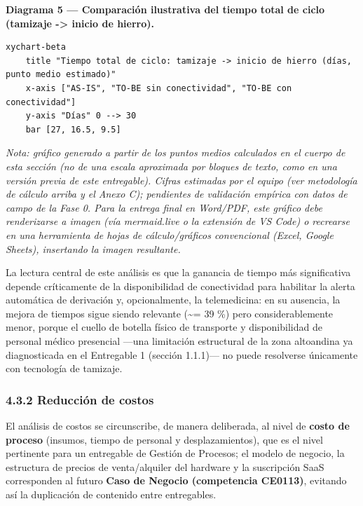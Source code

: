 \documentclass[11pt,a4paper]{article}
\begin{document}
\textbf{Diagrama 5 --- Comparación ilustrativa del tiempo total de ciclo (tamizaje -\textgreater{} inicio de hierro).}

\begin{samepage}\begin{verbatim}
xychart-beta
    title "Tiempo total de ciclo: tamizaje -> inicio de hierro (días, punto medio estimado)"
    x-axis ["AS-IS", "TO-BE sin conectividad", "TO-BE con conectividad"]
    y-axis "Días" 0 --> 30
    bar [27, 16.5, 9.5]
\end{verbatim}\end{samepage}

\emph{Nota: gráfico generado a partir de los puntos medios calculados en el cuerpo de esta sección (no de una escala aproximada por bloques de texto, como en una versión previa de este entregable). Cifras estimadas por el equipo (ver metodología de cálculo arriba y el Anexo C); pendientes de validación empírica con datos de campo de la Fase 0. Para la entrega final en Word/PDF, este gráfico debe renderizarse a imagen (vía mermaid.live o la extensión de VS Code) o recrearse en una herramienta de hojas de cálculo/gráficos convencional (Excel, Google Sheets), insertando la imagen resultante.}

La lectura central de este análisis es que la ganancia de tiempo más significativa depende críticamente de la disponibilidad de conectividad para habilitar la alerta automática de derivación y, opcionalmente, la telemedicina: en su ausencia, la mejora de tiempos sigue siendo relevante (\textasciitilde= 39 \%) pero considerablemente menor, porque el cuello de botella físico de transporte y disponibilidad de personal médico presencial ---una limitación estructural de la zona altoandina ya diagnosticada en el Entregable 1 (sección 1.1.1)--- no puede resolverse únicamente con tecnología de tamizaje.

\subsubsection{4.3.2 Reducción de costos}\label{reducciuxf3n-de-costos}

El análisis de costos se circunscribe, de manera deliberada, al nivel de \textbf{costo de proceso} (insumos, tiempo de personal y desplazamientos), que es el nivel pertinente para un entregable de Gestión de Procesos; el modelo de negocio, la estructura de precios de venta/alquiler del hardware y la suscripción SaaS corresponden al futuro \textbf{Caso de Negocio (competencia CE0113)}, evitando así la duplicación de contenido entre entregables.
\end{document}
